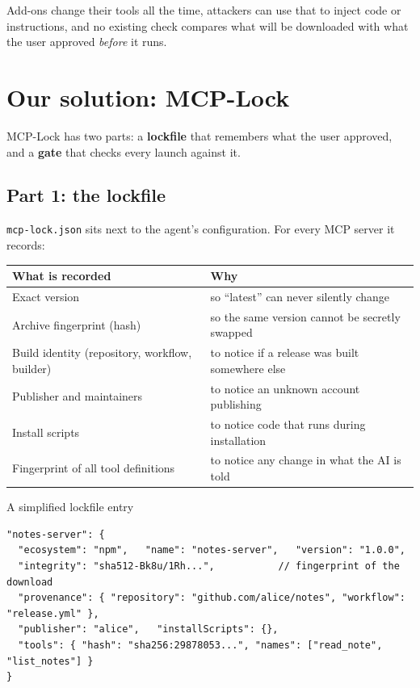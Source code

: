 \documentclass[11pt,a4paper]{article}
\newcommand{\code}[1]{\texttt{#1}}
\begin{document}
\begin{simple}
Add-ons change their tools all the time, attackers can use that to inject code or instructions, and no existing
check compares what will be downloaded with what the user approved \emph{before} it runs.
\end{simple}

\section{Our solution: MCP-Lock}

MCP-Lock has two parts: a \textbf{lockfile} that remembers what the user approved, and a \textbf{gate} that
checks every launch against it.

\subsection{Part 1: the lockfile}
\code{mcp-lock.json} sits next to the agent's configuration. For every MCP server it records:

\begin{center}
\begin{tabularx}{0.95\textwidth}{@{}lX@{}}
\toprule
\textbf{What is recorded} & \textbf{Why} \\
\midrule
Exact version & so ``latest'' can never silently change \\
Archive fingerprint (hash) & so the same version cannot be secretly swapped \\
Build identity (repository, workflow, builder) & to notice if a release was built somewhere else \\
Publisher and maintainers & to notice an unknown account publishing \\
Install scripts & to notice code that runs during installation \\
Fingerprint of all tool definitions & to notice any change in what the AI is told \\
\bottomrule
\end{tabularx}
\end{center}

\begin{example}{A simplified lockfile entry}
\footnotesize
\begin{verbatim}
"notes-server": {
  "ecosystem": "npm",   "name": "notes-server",   "version": "1.0.0",
  "integrity": "sha512-Bk8u/1Rh...",           // fingerprint of the download
  "provenance": { "repository": "github.com/alice/notes", "workflow": "release.yml" },
  "publisher": "alice",   "installScripts": {},
  "tools": { "hash": "sha256:29878053...", "names": ["read_note", "list_notes"] }
}
\end{verbatim}
\end{example}
\end{document}
